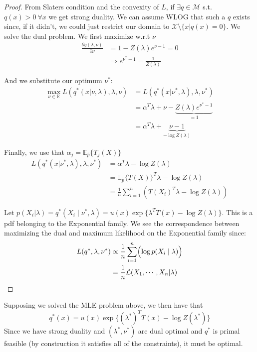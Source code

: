 \documentclass[]{article}
\theoremstyle{mattstyle}
\theoremstyle{definition}
\begin{document}
\begin{proof}
From Slaters condition and the convexity of $L$, if $\exists q \in \mathcal{M}$ s.t. $q(x)>0 \ \forall x$ we get strong duality. We can assume WLOG that such a $q$ exists since, if it didn't, we could just restrict our domain to $\mathcal{X} \setminus \{ x | q(x) = 0 \}$. We solve the dual problem. We first maximize w.r.t $\nu$
\begin{align*}
\frac{\partial  g(\lambda, \nu)}{\partial \nu } &= 1 - Z(\lambda)e^{\nu -1} = 0\\
&\Rightarrow  e^{\nu^*-1} = \frac{1}{Z(\lambda)}
\end{align*}

And we substitute our optimum $\nu^*$:
\begin{align*}
\max\limits_{\nu \in \mathbb{R}} L(q^*(x| \nu, \lambda),\lambda,\nu) &= L(q^*(x| \nu^*, \lambda),\lambda,\nu^*)\\
&= \alpha^T\lambda + \nu - \underbrace{Z(\lambda)e^{\nu^* -1}}_{=1}\\
&= \alpha^T\lambda + \underbrace{\nu - 1}_{-\log Z(\lambda)}
\end{align*}

Finally, we use that $\alpha_j = \mathbb{E}_{\hat{p}}\{T_j(X)\}$
\begin{align*}
L(q^*(x| \nu^*, \lambda),\lambda,\nu^*) &= \alpha^T\lambda -\log Z(\lambda)\\
&= \mathbb{E}_{\hat{p}}\{T(X)\}^T\lambda - \log Z(\lambda)\\
&= \frac{1}{n}\sum_{i=1}^n \left( T(X_i)^T\lambda - \log Z(\lambda) \right)
\end{align*}

Let  $p(X_i | \lambda) = q^*(X_i \mid \nu^*, \lambda) = u(x)\exp\{ \lambda^TT(x) - \log Z(\lambda)\}$. This is a pdf belonging to the Exponential family. We see the correspondence between maximizing the dual and maximum likelihood on the Exponential family since:
\begin{align*}
L(q^*,\lambda,\nu^*) &\propto \frac{1}{n}\sum_{i=1}^n \Bigl( \log p(X_i \mid \lambda) \Bigr) \\
&=\frac{1}{n}\mathcal{L}(X_1, \cdots, X_n | \lambda)
\end{align*}
\end{proof}

Supposing we solved the MLE problem above, we then have that 
$$q^*(x)=u(x)\exp\{ (\lambda^*)^TT(x) - \log Z(\lambda^*)\}$$
Since we have strong duality and $(\lambda^*, \nu^*)$ are dual optimal and $q^*$ is primal feasible (by construction it satisfies all of the constraints), it must be optimal.

\newpage



\end{document}
